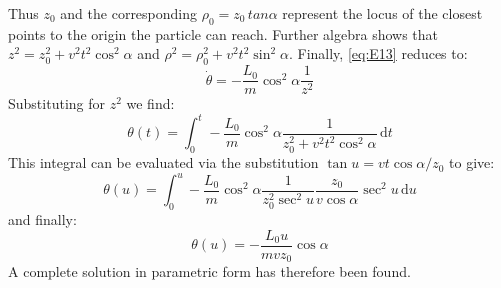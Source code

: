 \documentclass[twocolumn]{article}
\begin{document}
Thus $z_0$ and the corresponding $\rho_0=z_0 \, tan\alpha$ represent the locus of the closest points to the origin the particle can reach. Further algebra shows that $z^2 = z_0^2 + v^2 t^2 \cos^2\alpha$ and $\rho^2 = \rho_0^2 + v^2 t^2 \sin^2\alpha$. Finally, \eqref{eq:E13} reduces to:
\begin{equation}
\label{eq:E20}
\dot\theta = - \frac{L_0}{m}\cos^2\alpha\frac{1}{z^2}
\end{equation}
Substituting for $z^2$ we find:
\begin{equation}
\label{eq:E21}
\theta(t) = \int_0^t - \frac{L_0}{m} \cos^2\alpha \frac{1}{z_0^2 +v^2t^2\cos^2\alpha} \,\mathrm{d}t
\end{equation}
This integral can be evaluated via the substitution $\tan u = vt\cos\alpha/z_0$ to give:
\begin{equation}
\label{eq:E22}
\theta(u) = \int_0^u - \frac{L_0}{m} \cos^2\alpha  \frac{1}{z_0^2 \sec^2u} \frac{z_0}{v\cos\alpha} \sec^2u\,\mathrm{d}u
\end{equation}
and finally:
\begin{equation}
\label{eq:E23}
\theta(u) = - \frac{L_0u}{mvz_0} \cos\alpha
\end{equation}
A complete solution in parametric form has therefore been found.
\end{document}
